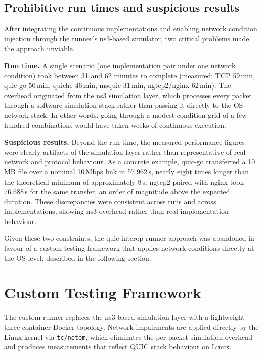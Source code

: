 \subsection{Prohibitive run times and suspicious results}
\label{subsec:interop-problems}

After integrating the continuous implementations and enabling network condition
injection through the runner's ns3-based simulator, two critical problems made
the approach unviable.

\textbf{Run time.} A single scenario (one implementation pair under one network
condition) took between 31 and 62 minutes to complete (measured: TCP 59\,min,
quic-go 50\,min, quiche 46\,min, msquic 31\,min, ngtcp2/nginx 62\,min).
The overhead originated from the ns3 simulation layer, which processes every
packet through a software simulation stack rather than passing it directly to
the OS network stack. In other words, going through a modest condition grid of a
few hundred combinations would have taken weeks of continuous execution.

\textbf{Suspicious results.} Beyond the run time, the measured performance
figures were clearly artifacts of the simulation layer rather than
representative of real network and protocol behaviour. As a concrete example, quic-go
transferred a 10\,MB file over a nominal 10\,Mbps link in 57.962\,s, nearly
eight times longer than the theoretical minimum of approximately 8\,s.
ngtcp2 paired with nginx took 76.688\,s for the same transfer, an order of
magnitude above the expected duration. These discrepancies were consistent
across runs and across implementations, showing ns3 overhead rather than real
implementation behaviour.

Given these two constraints, the quic-interop-runner approach was abandoned in
favour of a custom testing framework that applies network conditions directly
at the OS level, described in the following section.

\section{Custom Testing Framework}
\label{sec:custom-runner}

The custom runner replaces the ns3-based simulation layer with a lightweight
three-container Docker topology. Network impairments are applied
directly by the Linux kernel via \texttt{tc/netem}, which eliminates the
per-packet simulation overhead and produces measurements that reflect
QUIC stack behaviour on Linux.

